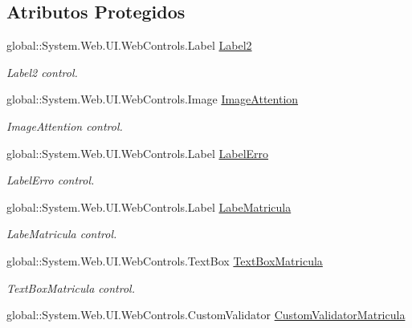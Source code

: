 \subsection*{Atributos Protegidos}
\begin{DoxyCompactItemize}
\item 
global::System.Web.UI.WebControls.Label \hyperlink{class_sistema_r_h_1_1_cadastro_user_ab5f9d7756583be8406155b783f3a25cd}{Label2}
\begin{DoxyCompactList}\small\item\em Label2 control. \item\end{DoxyCompactList}\item 
global::System.Web.UI.WebControls.Image \hyperlink{class_sistema_r_h_1_1_cadastro_user_ac26a207db24e271bfd6d2a88a0e30148}{ImageAttention}
\begin{DoxyCompactList}\small\item\em ImageAttention control. \item\end{DoxyCompactList}\item 
global::System.Web.UI.WebControls.Label \hyperlink{class_sistema_r_h_1_1_cadastro_user_aaccd2e2ae995aa1d687ca7a609eb9a4c}{LabelErro}
\begin{DoxyCompactList}\small\item\em LabelErro control. \item\end{DoxyCompactList}\item 
global::System.Web.UI.WebControls.Label \hyperlink{class_sistema_r_h_1_1_cadastro_user_a704a4700661e48721cd40a9f0760d023}{LabeMatricula}
\begin{DoxyCompactList}\small\item\em LabeMatricula control. \item\end{DoxyCompactList}\item 
global::System.Web.UI.WebControls.TextBox \hyperlink{class_sistema_r_h_1_1_cadastro_user_a1b31ea83fdaa5e27197df523cf89da85}{TextBoxMatricula}
\begin{DoxyCompactList}\small\item\em TextBoxMatricula control. \item\end{DoxyCompactList}\item 
global::System.Web.UI.WebControls.CustomValidator \hyperlink{class_sistema_r_h_1_1_cadastro_user_a851aa0b26928f5d46156761af83bc076}{CustomValidatorMatricula}

\end{DoxyCompactItemize}
